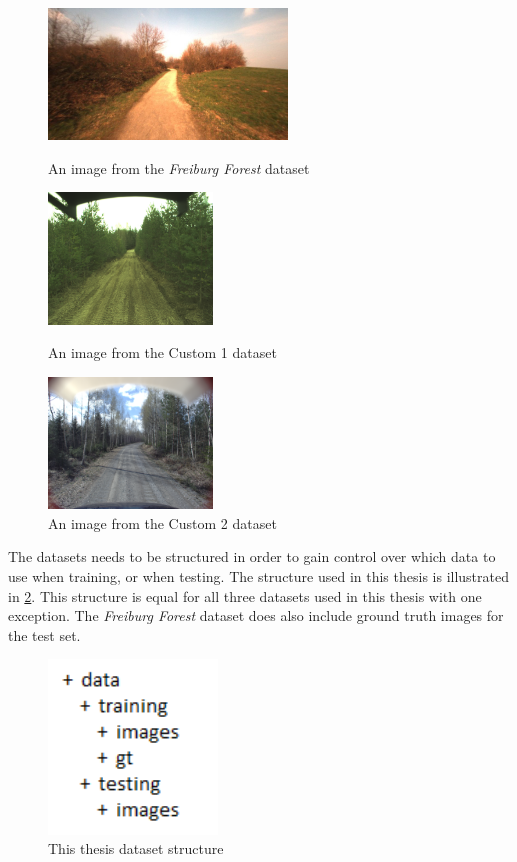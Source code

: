 \documentclass[USenglish]{ifimaster}  %
\begin{document}
\begin{figure}[!htb]
  \includegraphics[width=\linewidth, height=3.5cm]{bilder/freiburg.png}
  \caption{An image from the \textit{Freiburg Forest} dataset}\label{fig:awesome_image1}
\endminipage\hfill
{}
  \includegraphics[width=\linewidth, height=3.5cm]{bilder/custom_1.png}
  \caption{An image from the Custom 1 dataset}\label{fig:awesome_image2}
\endminipage\hfill
{}%
  \includegraphics[width=\linewidth, height=3.5cm]{bilder/custom_2.png}
  \caption{An image from the Custom 2 dataset}\label{fig:awesome_image3}
\endminipage
\end{figure}

The datasets needs to be structured in order to gain control over which data to use when training, or when testing. The structure used in this thesis is illustrated in \cref{fig:dataset_structure}. This structure is equal for all three datasets used in this thesis with one exception. The \textit{Freiburg Forest} dataset does also include ground truth images for the test set.

\begin{figure}[ht]
    \centering
    \includegraphics[width=0.4\textwidth]{bilder/dataset_structure.PNG}
    \caption{This thesis dataset structure}
    \label{fig:dataset_structure}
\end{figure}
\end{document}
